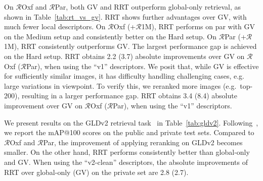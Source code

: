 On $\mathcal{R}$Oxf and $\mathcal{R}$Par, both GV and RRT outperform global-only retrieval, as shown in Table~\ref{tab:rt_vs_gv}. 
RRT shows further advantages over GV, with much fewer local descriptors. 
On $\mathcal{R}$Oxf (+$\mathcal{R}$1M), RRT performs on par with GV on the Medium setup and consistently better on the Hard setup.
On $\mathcal{R}$Par (+$\mathcal{R}$1M), RRT consistently outperforms GV.
The largest performance gap is achieved on the Hard setup.
RRT obtains 2.2 (3.7) absolute improvements over GV on $\mathcal{R}$Oxf ($\mathcal{R}$Par), when using the ``v1'' descriptors.
We posit that, while GV is effective for sufficiently similar images, it has difficulty handling challenging cases, e.g. large variations in viewpoint.
To verify this, we reranked more images (e.g.~top-200), resulting in a larger performance gap.
RRT obtains 3.4 (8.4) absolute improvement over GV on $\mathcal{R}$Oxf ($\mathcal{R}$Par), when using the ``v1'' descriptors.


We present results on the GLDv2 retrieval task~\cite{gldv2} in Table~\ref{tab:gldv2}.
Following~\cite{delg2020}, we report the mAP@100 scores on the public and private test sets.
Compared to $\mathcal{R}$Oxf and $\mathcal{R}$Par, the improvement of applying reranking on GLDv2 becomes smaller.
On the other hand, RRT performs consistently better than global-only and GV.
When using the ``v2-clean'' descriptors, the absolute improvements of RRT over global-only (GV) on the private set are 2.8 (2.7).





